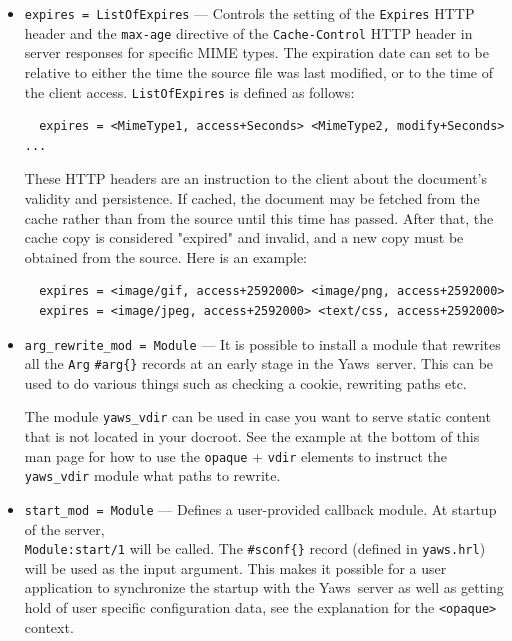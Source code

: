 \documentclass[11pt,oneside,english]{book}
\newcommand{\Yaws}            %
        {{\sc Yaws}}
\begin{document}
\begin{itemize}
\item       \verb+expires = ListOfExpires+ ---
              Controls the setting of the \verb+Expires+ HTTP header and the
              \verb+max-age+ directive of the \verb+Cache-Control+ HTTP header
              in server responses for specific MIME types. The expiration date
              can set to be relative to either the time the source file was last
              modified, or to the time of the client
              access. \verb+ListOfExpires+ is defined as follows:
\begin{verbatim}
  expires = <MimeType1, access+Seconds> <MimeType2, modify+Seconds> ...
\end{verbatim}
              These HTTP headers are an instruction to the client about the
              document's validity and persistence. If cached, the document may
              be fetched from the cache rather than from the source until this
              time has passed. After that, the cache copy is considered
              "expired" and invalid, and a new copy must be obtained from the
              source.
              Here is an example:
\begin{verbatim}
  expires = <image/gif, access+2592000> <image/png, access+2592000>
  expires = <image/jpeg, access+2592000> <text/css, access+2592000>
\end{verbatim}

\item       \verb+arg_rewrite_mod = Module+ ---
              It is possible to install a module that rewrites all the
              \verb+Arg+ \verb+#arg{}+ records at an early stage in the
              \Yaws\ server.  This can be used to do various things such as
              checking a cookie, rewriting paths etc.

              The module \verb+yaws_vdir+ can be used in case you want to serve
              static content that is not located in your docroot. See the
              example at the bottom of this man page for how to use the
              \verb+opaque+ + \verb+vdir+ elements to instruct the
              \verb+yaws_vdir+ module what paths to rewrite.

\item       \verb+start_mod = Module+ ---
              Defines a user-provided callback module. At startup of the server,\\
              \verb+Module:start/1+ will be called.  The \verb+#sconf{}+ record
              (defined in \verb+yaws.hrl+) will be used as the input argument. This
              makes it possible for a user application to synchronize the
              startup with the \Yaws\ server as well as getting hold of user
              specific configuration data, see the explanation for the
              \verb+<opaque>+ context.


\end{itemize}
\end{document}
